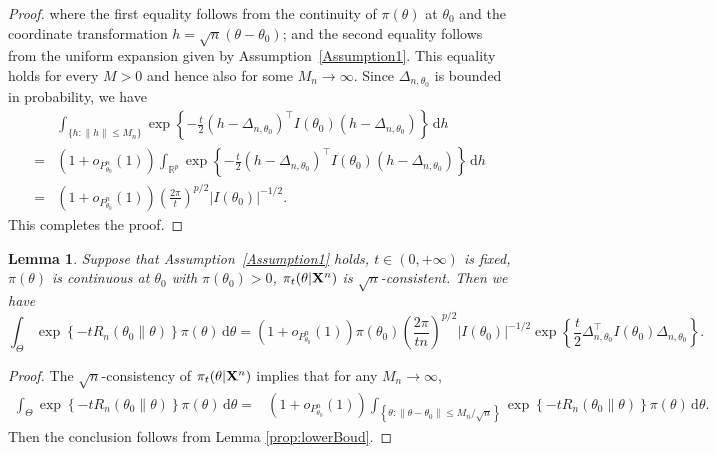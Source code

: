 \documentclass[11pt]{article}
\theoremstyle{plain}
\newtheorem{lemma}{\quad\quad Lemma}
\theoremstyle{definition}
\theoremstyle{remark}
\begin{document}
\begin{appendices}
\begin{proof}
where the first equality follows from the continuity of $\pi(\theta)$ at $\theta_0$ and the coordinate transformation $h=\sqrt{n}(\theta-\theta_0)$;
and the second equality follows from the uniform expansion given by Assumption~\ref{Assumption1}.
This equality holds for every $M>0$ and hence also for some $M_n\to \infty$.
Since $\Delta_{n,\theta_0}$ is bounded in probability, we have
        $$
            \begin{aligned}
                & \int_{\{h:\|h\|\leq M_n\}}\exp\left\{ -\frac{t}{2}(h-\Delta_{n,\theta_0})^\top  I({\theta_0})(h-\Delta_{n,\theta_0})\right\} \, \mathrm dh
                \\
                =&
                (1+o_{P^n_{\theta_0}}(1))
                \int_{\mathbb{R}^p}\exp\left\{ -\frac{t}{2}(h-\Delta_{n,\theta_0})^\top  I({\theta_0})(h-\Delta_{n,\theta_0})\right\} \, \mathrm dh
                \\
                =&
                (1+o_{P^n_{\theta_0}}(1))
                \left(\frac{2\pi}{t}\right)^{{p}/{2}} |I({\theta_0})|^{-{1}/{2}}
.
            \end{aligned}
        $$
        This completes the proof.
     
\end{proof}




\begin{lemma}
    Suppose that Assumption~\ref{Assumption1} holds, $t\in (0,+\infty)$ is fixed,  $\pi(\theta)$ is continuous at $\theta_0$ with $\pi(\theta_0)>0$, $\pi_{t}(\theta|\mathbf{X}^{n})$ is $\sqrt{n}$-consistent.
        Then we have
$$
    \int_{\Theta}
    \exp\left\{-t R_n(\theta_0\| \theta) \right\} \pi(\theta)
\, \mathrm d \theta
    =
    (1+o_{P^n_{\theta_0}}(1))
    \pi(\theta_0)
    \left(\frac{2\pi}{t n}\right)^{{p}/{2}}
    |I(\theta_0)|^{-{1}/{2}} 
    \exp
    \left\{ 
        \frac{t}{2}\Delta_{n,\theta_0}^\top  I({\theta_0})\Delta_{n,\theta_0}
\right\}
    .
$$
    \label{prop:2019rock1}
\end{lemma}
\begin{proof}
    The $\sqrt n$-consistency of $\pi_t (\theta | \mathbf{X}^n)$ implies that for any $M_n \to \infty$,
$$
\begin{aligned}
     \int_{\Theta}
     \exp\left\{ -t R_n(\theta_0\| \theta) \right\} \pi(\theta)
\, \mathrm d \theta
    =&
    (1+o_{P^n_{\theta_0}}(1))
\int_{\left\{ \theta: \|\theta - \theta_0\| \leq M_n /\sqrt n \right\}}
\exp\left\{-t R_n(\theta_0\| \theta)\right\} \pi(\theta)
\, \mathrm d \theta
.
\end{aligned}
$$
Then the conclusion follows from Lemma \ref{prop:lowerBoud}.
\end{proof}


\end{appendices}
\end{document}
